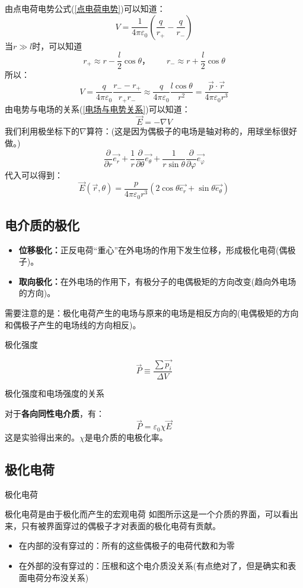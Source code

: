 \documentclass[cn,hazy,blue,14pt,normal]{elegantnote}
\numberwithin{equation}{section}
\begin{document}
由点电荷电势公式(\ref{点电荷电势})可以知道：
$$V = \frac{1}{4\pi\varepsilon_0}\left(\frac{q}{r_+}-\frac{q }{r_-}\right)$$
当$r \gg l$时，可以知道$$r_+ \approx r - \frac l2 \cos\theta，\qquad r_- \approx r + \frac l2\cos\theta$$
所以：
$$
V=\frac{q}{4 \pi \varepsilon_{0}} \frac{r_{-}-r_{+}}{r_{+} r_{-}} \approx \frac{q}{4 \pi \varepsilon_{0}} \frac{l \cos \theta}{r^{2}}=\frac{\vec{p} \cdot \vec{r}}{4 \pi \varepsilon_{0} r^{3}}
$$
由电势与电场的关系(\ref{电场与电势关系})可以知道：
$$\vec{E}=-\nabla V$$
我们利用极坐标下的$\nabla$算符：(这是因为偶极子的电场是轴对称的，用球坐标很好做。)
$$
\frac{\partial}{\partial r}\vec{e_r}+
\frac 1r \frac{\partial}{\partial \theta}\vec{e_\theta}+
\frac{1}{r\sin\theta}\frac{\partial}{\partial\varphi}\vec{e_\varphi}
$$
代入可以得到：
$$
\vec{E}(\vec{r},\theta)=
\frac{p}{4 \pi \varepsilon_0 r^3}
\left(2\cos\theta\vec{e_r}+\sin\theta\vec{e_\theta}\right)
$$
\subsection{电介质的极化}
\begin{itemize}
	\item \textbf{位移极化：}正反电荷“重心”在外电场的作用下发生位移，形成极化电荷(偶极子)。
	\item \textbf{取向极化：}在外电场的作用下，有极分子的电偶极矩的方向改变(趋向外电场的方向)。
\end{itemize}
需要注意的是：极化电荷产生的电场与原来的电场是相反方向的(电偶极矩的方向和偶极子产生的电场线的方向相反)。
\begin{definition}
	极化强度
\end{definition}
\begin{equation}\label{极化强度定义}
	\vec{P} \equiv \frac{\sum \vec{p_i}}{\Delta V}
\end{equation}
\begin{theorem}
	极化强度和电场强度的关系
\end{theorem}
对于\textbf{各向同性电介质}，有：
\begin{equation}
	\vec{P} = \varepsilon_0\chi\vec{E}
\end{equation}
这是实验得出来的。$\chi$是电介质的电极化率。
\subsection{极化电荷}
\begin{definition}
	极化电荷
\end{definition}
极化电荷是由于极化而产生的宏观电荷
如图所示这是一个介质的界面，可以看出来，只有被界面穿过的偶极子才对表面的极化电荷有贡献。
\begin{itemize}
	\item 在内部的没有穿过的：所有的这些偶极子的电荷代数和为零
	\item 在外部的没有穿过的：压根和这个电介质没关系(有点绝对了，但是确实和表面电荷分布没关系)
\end{itemize}
\end{document}
